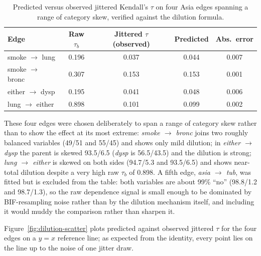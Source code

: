 \documentclass[
  english,
  class=report,
  accentcolor=2c,
  marginpar=false,
  parskip=half-,
  fontsize=11pt,
  ruledheaders=false,
  pdfa=false,
  IMRAD=false,
  thesis={type=master}
]{tudapub}
\begin{document}
\begin{table}[ht]
\caption{Predicted versus observed jittered Kendall's $\tau$ on four Asia edges spanning a range of category skew, verified against the dilution formula.}
\label{tab:jitter}
\centering
\begin{tabular}{lcccc}
\toprule
\textbf{Edge} & \textbf{Raw $\tau_b$} & \textbf{Jittered $\tau$ (observed)} & \textbf{Predicted} & \textbf{Abs.\ error} \\
\midrule
smoke $\to$ lung   & 0.196 & 0.037 & 0.044 & 0.007 \\
smoke $\to$ bronc  & 0.307 & 0.153 & 0.153 & 0.001 \\
either $\to$ dysp  & 0.195 & 0.041 & 0.048 & 0.006 \\
lung $\to$ either  & 0.898 & 0.101 & 0.099 & 0.002 \\
\bottomrule
\end{tabular}
\end{table}

These four edges were chosen deliberately to span a range of category
skew rather than to show the effect at its most extreme: \emph{smoke
$\to$ bronc} joins two roughly balanced variables (49/51 and 55/45) and
shows only mild dilution; in \emph{either $\to$ dysp} the parent is skewed
93.5/6.5 (\emph{dysp} is 56.5/43.5) and the dilution is strong; \emph{lung
$\to$ either} is skewed on both sides (94.7/5.3 and 93.5/6.5) and shows
near-total dilution despite a very high raw $\tau_b$ of 0.898. A fifth
edge, \emph{asia $\to$ tub}, was fitted but is excluded from the table: both
variables are about 99\% ``no'' (98.8/1.2 and 98.7/1.3),
so the raw dependence signal is small enough to be dominated by
BIF-resampling noise rather than by the dilution mechanism itself, and
including it would muddy the comparison rather than sharpen it.

Figure~\ref{fig:dilution-scatter} plots predicted against observed jittered
$\tau$ for the four edges on a $y=x$ reference line; as expected from the
identity, every point lies on the line up to the noise of one jitter draw.
\end{document}
